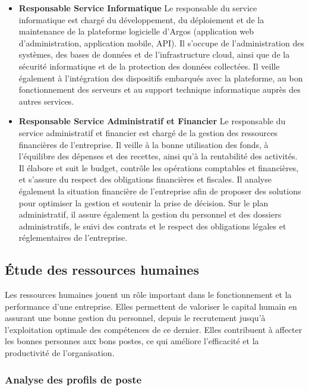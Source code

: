 \begin{itemize}
    \item \textbf{Responsable Service Informatique}
    Le responsable du service informatique est chargé du développement, du déploiement et de la maintenance de la plateforme logicielle d'Argos (application web d'administration, application mobile, API). Il s'occupe de l'administration des systèmes, des bases de données et de l'infrastructure cloud, ainsi que de la sécurité informatique et de la protection des données collectées. Il veille également à l'intégration des dispositifs embarqués avec la plateforme, au bon fonctionnement des serveurs et au support technique informatique auprès des autres services.

    \item \textbf{Responsable Service Administratif et Financier}
    Le responsable du service administratif et financier est chargé de la gestion des ressources financières de l'entreprise. Il veille à la bonne utilisation des fonds, à l'équilibre des dépenses et des recettes, ainsi qu'à la rentabilité des activités. Il élabore et suit le budget, contrôle les opérations comptables et financières, et s'assure du respect des obligations financières et fiscales. Il analyse également la situation financière de l'entreprise afin de proposer des solutions pour optimiser la gestion et soutenir la prise de décision. Sur le plan administratif, il assure également la gestion du personnel et des dossiers administratifs, le suivi des contrats et le respect des obligations légales et réglementaires de l'entreprise.


\end{itemize}
\subsection{Étude des ressources humaines}

Les ressources humaines jouent un rôle important dans le fonctionnement et la performance d'une entreprise. Elles permettent de valoriser le capital humain en assurant une bonne gestion du personnel, depuis le recrutement jusqu'à l'exploitation optimale des compétences de ce dernier. Elles contribuent à affecter les bonnes personnes aux bons postes, ce qui améliore l'efficacité et la productivité de l'organisation.

\subsubsection{Analyse des profils de poste}

